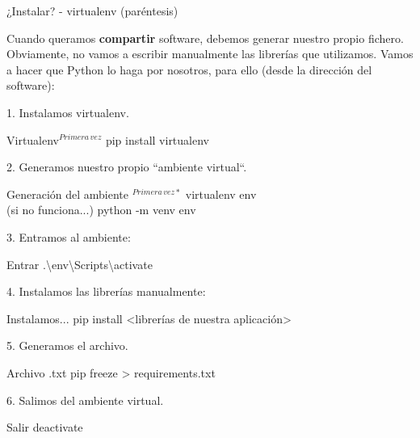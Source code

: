 \begin{frame}[allowframebreaks]{¿Instalar? - virtualenv (par\'entesis)}\vspace{0pt}

Cuando queramos \textbf{compartir} software, debemos generar nuestro propio fichero. Obviamente, no vamos a escribir manualmente las librer\'ias que utilizamos. Vamos a hacer que Python lo haga por nosotros, para ello (desde la direcci\'on del software):

\vspace{5pt}

1. Instalamos virtualenv.

\begin{block}{Virtualenv$^{Primera \, vez}$}
	pip install virtualenv
\end{block}

2. Generamos nuestro propio ``ambiente virtual``.

\begin{block}{Generaci\'on del ambiente $^{Primera \, vez*}$}
	virtualenv env\\
	(si no funciona...) python -m venv env
\end{block}

\vspace{20pt}

3. Entramos al ambiente:

\begin{block}{Entrar}
	.\textbackslash env\textbackslash Scripts\textbackslash activate
\end{block}

4. Instalamos las librerías manualmente:

\begin{block}{Instalamos...}
	pip install <librer\'ias de nuestra aplicaci\'on>
\end{block}

5. Generamos el archivo.

\begin{block}{Archivo .txt}
	pip freeze > requirements.txt
\end{block}

6. Salimos del ambiente virtual.

\begin{block}{Salir}
	deactivate
\end{block}

\end{frame}